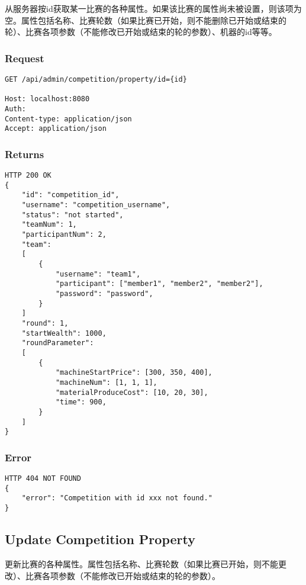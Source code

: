 \documentclass{article}
\begin{document}
从服务器按id获取某一比赛的各种属性。如果该比赛的属性尚未被设置，则该项为空。属性包括名称、比赛轮数（如果比赛已开始，则不能删除已开始或结束的轮）、比赛各项参数（不能修改已开始或结束的轮的参数）、机器的id等等。

\subsubsection*{Request}
\begin{lstlisting}
GET /api/admin/competition/property/id={id}

Host: localhost:8080
Auth:
Content-type: application/json
Accept: application/json
\end{lstlisting}

\subsubsection*{Returns}
\begin{lstlisting}
HTTP 200 OK
{
    "id": "competition_id",
    "username": "competition_username",
    "status": "not started",
    "teamNum": 1,
    "participantNum": 2,
    "team":
    [
        {
            "username": "team1",
            "participant": ["member1", "member2", "member2"],
            "password": "password",
        }
    ]
    "round": 1,
    "startWealth": 1000,
    "roundParameter":
    [
        {
            "machineStartPrice": [300, 350, 400],
            "machineNum": [1, 1, 1],
            "materialProduceCost": [10, 20, 30],
            "time": 900,
        }
    ]
}

\end{lstlisting}

\subsubsection*{Error}
\begin{lstlisting}
HTTP 404 NOT FOUND
{
    "error": "Competition with id xxx not found."
}
\end{lstlisting}

\subsection{Update Competition Property}

更新比赛的各种属性。属性包括名称、比赛轮数（如果比赛已开始，则不能更改）、比赛各项参数（不能修改已开始或结束的轮的参数）。
\end{document}
